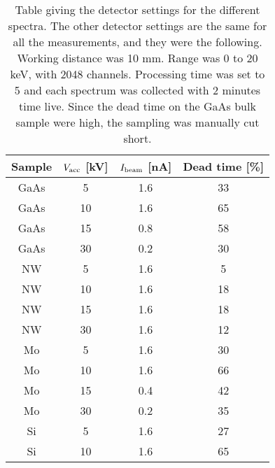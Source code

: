 \begin{table}[ht]
    \centering
    \caption{
        Table giving the detector settings for the different spectra.
        The other detector settings are the same for all the measurements, and they were the following.
        Working distance was 10 mm.
        Range was 0 to 20 keV, with 2048 channels.
        Processing time was set to 5 and each spectrum was collected with 2 minutes time live.
        Since the dead time on the GaAs bulk sample were high, the sampling was manually cut short.
    }
    \label{tab:method:detector:settings}
    \begin{tabular}{cccc}
        Sample & $V_\textnormal{acc}$ {[kV]} & $I_\textnormal{beam}$ {[nA]} & Dead time [\%] \\
        \hline
        GaAs   & 5                           & 1.6                          & 33             \\
        GaAs   & 10                          & 1.6                          & 65             \\
        GaAs   & 15                          & 0.8                          & 58             \\
        GaAs   & 30                          & 0.2                          & 30             \\
        NW     & 5                           & 1.6                          & 5              \\
        NW     & 10                          & 1.6                          & 18             \\
        NW     & 15                          & 1.6                          & 18             \\
        NW     & 30                          & 1.6                          & 12             \\
        Mo     & 5                           & 1.6                          & 30             \\
        Mo     & 10                          & 1.6                          & 66             \\
        Mo     & 15                          & 0.4                          & 42             \\
        Mo     & 30                          & 0.2                          & 35             \\
        Si     & 5                           & 1.6                          & 27             \\
        Si     & 10                          & 1.6                          & 65             \\

\end{tabular}
\end{table}
